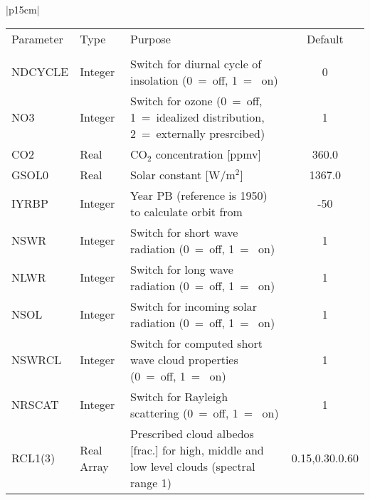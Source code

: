 \begin{center}
\begin{tabular}{|p{15cm}|}
\begin{center}
\begin{tabular}{l l p{5cm} c}  %
Parameter & Type & Purpose & Default \\
&&&\\
NDCYCLE & Integer & Switch for diurnal cycle of insolation (0~=~off, 1~=~ on) & 0 \\
NO3 & Integer &Switch for ozone (0~=~off, 1~=~idealized distribution, 2~=~externally
presrcibed) & 1 \\
CO2 & Real & CO$_2$ concentration [ppmv] & 360.0 \\
GSOL0 & Real & Solar constant [W/m$^2$] & 1367.0 \\
IYRBP & Integer & Year PB (reference is 1950) to calculate orbit from & -50 \\
NSWR& Integer & Switch for short wave radiation (0~=~off, 1~=~ on)  & 1 \\
NLWR& Integer & Switch for long wave radiation (0~=~off, 1~=~ on)  & 1 \\
NSOL& Integer & Switch for incoming solar radiation (0~=~off, 1~=~ on)  & 1 \\
NSWRCL& Integer & Switch for computed short wave cloud properties (0~=~off, 1~=~ on) 
& 1 \\
NRSCAT&  Integer & Switch for Rayleigh scattering (0~=~off, 1~=~ on)  & 1 \\
RCL1(3) & Real Array & Prescribed cloud albedos [frac.] for high, middle and low level
clouds
(spectral range 1)& 0.15,0.30.0.60 \\
\end{tabular}
\end{center}
\vspace{3mm} \\
\hline
\end{tabular}
\end{center}

\newpage 

